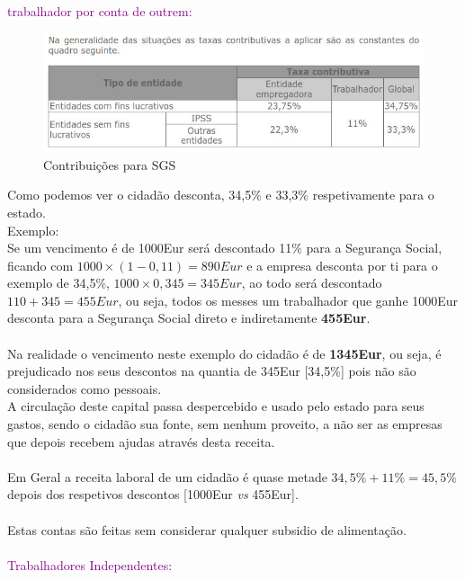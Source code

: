 \textup{\large \textcolor{purple}{trabalhador por conta de outrem:}}\\
\begin{figure}[H]
\flushleft
\includegraphics[scale=.5]{./image/SGS/Contribuicoes_1.jpg}
\caption{Contribuições para SGS}
\end{figure}\par
Como podemos ver o cidadão desconta, 34,5\% e 33,3\% respetivamente para o estado.\\
Exemplo:\\ 
Se um vencimento é de 1000Eur será descontado 11\% para a Segurança Social, ficando com $1000\times (1-0,11)=890Eur$ e a empresa desconta por ti para o exemplo de 34,5\%, $1000\times 0,345=345Eur$, ao todo será descontado $110+345=455Eur$, ou seja, todos os messes um trabalhador que ganhe 1000Eur desconta para a Segurança Social direto e indiretamente \textbf{455Eur}.\\ \\
Na realidade o vencimento neste exemplo do cidadão é de \textbf{1345Eur}, ou seja, é prejudicado nos seus descontos na quantia de 345Eur [34,5\%] pois não são considerados como pessoais.\\
A circulação deste capital passa despercebido e usado pelo estado para seus gastos, sendo o cidadão sua fonte, sem nenhum proveito, a não ser as empresas que depois recebem ajudas através desta receita.\\ \\
Em Geral a receita laboral de um cidadão é quase metade $34,5\%+11\%=45,5\%$ depois dos respetivos descontos [1000Eur \textit{vs} 455Eur].\\ \\
Estas contas são feitas sem considerar qualquer subsidio de alimentação.\\ \\

\textup{\large \textcolor{purple}{Trabalhadores Independentes:}}\\

